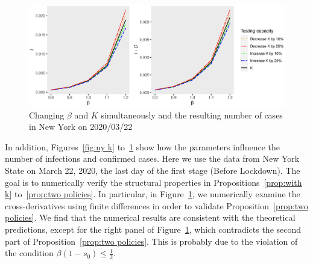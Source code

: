 \documentclass[nonblindrev, copyedit]{informs3a}
\newcommand\cz[1]{\textcolor{blue}{CZ: #1}}
\newcounter{prop}[chapter]
\begin{document}
\begin{figure}[ht]
	\centering
 	\caption{Changing $\beta$ and $K$ simultaneously and the resulting number of cases in New York on 2020/03/22}
 	\label{fig:ny beta and k}
	\includegraphics[width=0.9\linewidth, angle=0]{two_policies.eps}
\end{figure}

In addition, Figures~\ref{fig:ny k} to~\ref{fig:ny beta and k} show how the parameters influence the number of infections and confirmed cases.
Here we use the data from New York State on March 22, 2020, the last day of the first stage (Before Lockdown).
The goal is to numerically verify the structural properties in Propositions~\ref{prop:with k} to~\ref{prop:two policies}.
In particular, in Figure~\ref{fig:ny beta and k}, we numerically examine the cross-derivatives using finite differences in order to validate Proposition~\ref{prop:two policies}.
We find that the numerical results are consistent with the theoretical predictions, except for the right panel of Figure~\ref{fig:ny beta and k}, which contradicts the second part of Proposition~\ref{prop:two policies}.
This is probably due to the violation of the condition $\beta(1-s_0)\le\frac{1}{2}$.

\end{document}
